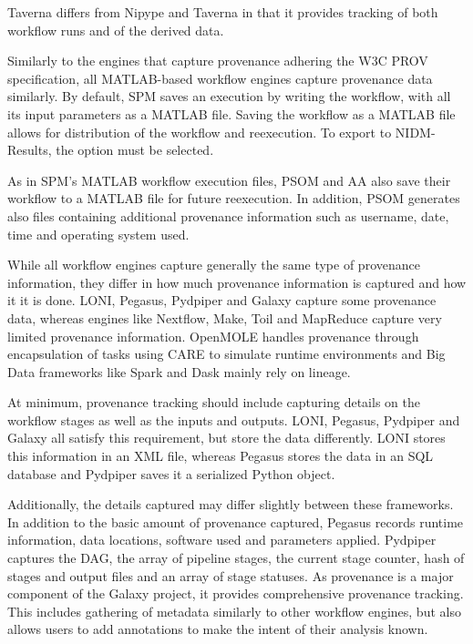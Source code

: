             Taverna differs from Nipype and Taverna in that it provides tracking
            of both workflow runs and of the derived data.

            Similarly to the engines that capture provenance adhering the W3C
            PROV specification, all MATLAB-based workflow engines capture
            provenance data similarly. By default, SPM saves an execution by
            writing the  workflow, with all its input parameters as a MATLAB
            file. Saving the workflow as a MATLAB file allows for distribution
            of the workflow and reexecution. To export to NIDM-Results, the
            option must be selected.
            
            As in SPM's MATLAB workflow execution files, PSOM and AA also save
            their workflow to a MATLAB file for future reexecution. In addition,
            PSOM generates also files containing additional provenance
            information such as username, date, time and operating system used.
            
            While all workflow engines capture generally the same type of
            provenance information, they differ in how much provenance
            information is captured and how it it is done. LONI, Pegasus, Pydpiper
            and Galaxy capture some provenance data, whereas engines like
            Nextflow, Make, Toil and MapReduce capture very limited  
            provenance information. OpenMOLE handles provenance through
            encapsulation of tasks using CARE to simulate runtime environments
            and Big Data frameworks like Spark and Dask mainly rely on lineage.

            At minimum, provenance tracking should include capturing details on
            the workflow stages as well as the inputs and outputs. LONI,
            Pegasus, Pydpiper and Galaxy all satisfy this requirement, but store
            the data differently. LONI stores this information in an XML file,
            whereas Pegasus stores the data in an SQL database and Pydpiper
            saves it a serialized Python object.

            Additionally, the details captured may differ slightly between these
            frameworks. In addition to the basic amount of  provenance captured,
            Pegasus records runtime information, data locations, software used
            and parameters applied. Pydpiper captures the DAG, the array of
            pipeline stages, the current stage counter, hash of stages and
            output files and an array of stage statuses. As provenance is a
            major component of the Galaxy project, it provides comprehensive
            provenance tracking. This includes gathering of metadata similarly
            to other workflow engines, but also allows users to add annotations
            to make the intent of their analysis known.

